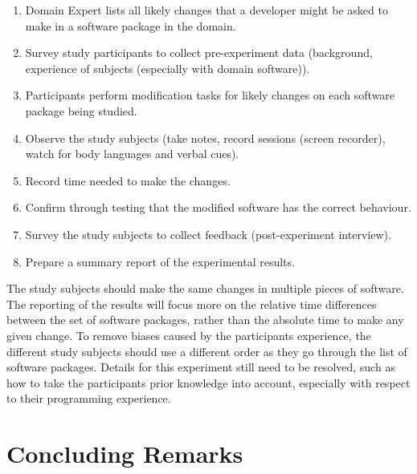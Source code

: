 \documentclass[letterpaper,cleveref]{lipics-v2019}
\begin{document}
\begin{enumerate}
	\item Domain Expert lists all likely changes that a developer
	might be asked to make in a software package in the domain.
	\item Survey study participants to collect pre-experiment data (background,
	experience of subjects (especially with domain software)).
	\item Participants perform modification tasks for likely changes on each
	software package being studied.
	\item Observe the study subjects (take notes, record sessions (screen
	recorder), watch for body languages and verbal cues).
	\item Record time needed to make the changes.	
	\item Confirm through testing that the modified software has the correct
	behaviour.
	\item Survey the study subjects to collect feedback (post-experiment interview).
	\item Prepare a summary report of the experimental results.
\end{enumerate}

The study subjects should make the same changes in multiple pieces of software.
The reporting of the results will focus more on the relative time differences
between the set of software packages, rather than the absolute time to make any
given change. To remove biases caused by the participants experience, the
different study subjects should use a different order as they go through the
list of software packages.  Details for this experiment still need to be
resolved, such as how to take the participants prior knowledge into account,
especially with respect to their programming experience.

\section{Concluding Remarks} \label{SecConcludingRemarks}
\end{document}
